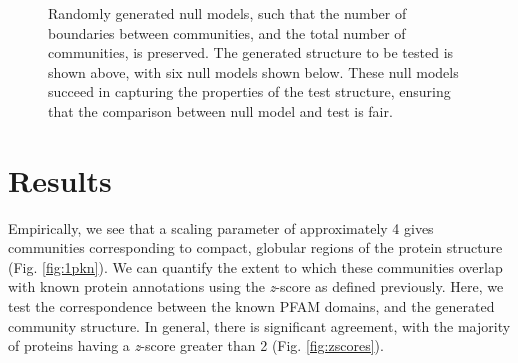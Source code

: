 \documentclass[a4paper,numbib, final, twoside, titelpage]{imaiai}%
\begin{document}
\begin{figure}
    \begin{center}
        \quad
        \quad
        \quad


        \caption[Randomly generated null models]{Randomly generated null models, such that the number of boundaries between communities, and the total number of communities, is preserved. The generated structure to be tested is shown above, with six null models shown below. These null models succeed in capturing the properties of the test structure, ensuring that the comparison between null model and test is fair. }
        \label{fig:nullmodels}
    \end{center}

\end{figure}

\section{Results}
\label{sec:Results}


Empirically, we see that a scaling parameter of approximately 4 gives communities corresponding to compact, globular regions of the protein structure (Fig. \ref{fig:1pkn}). We can quantify the extent to which these communities overlap with known protein annotations using the \textit{z}-score as defined previously. Here, we test the correspondence between the known PFAM domains, and the generated community structure.  In general, there is significant agreement, with the majority of proteins having a \textit{z}-score greater than 2 (Fig. \ref{fig:zscores}).
\end{document}
